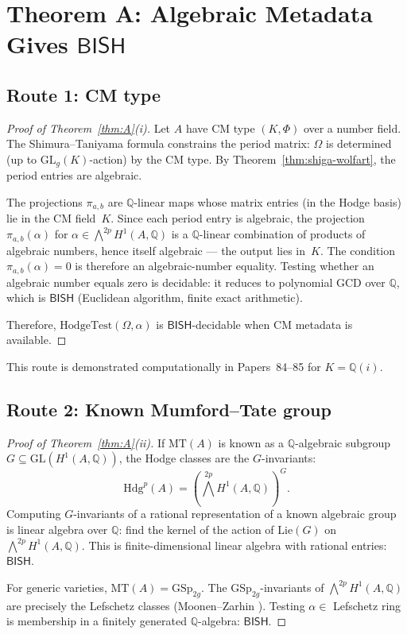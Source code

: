 \documentclass[11pt]{article}
\theoremstyle{plain}
\theoremstyle{definition}
\theoremstyle{remark}
\newcommand{\Q}{\mathbb{Q}}
\newcommand{\GL}{\mathrm{GL}}
\newcommand{\MT}{\mathrm{MT}}
\newcommand{\Hdg}{\mathrm{Hdg}}
\newcommand{\BISH}{\ensuremath{\mathsf{BISH}}}
\begin{document}
\section{Theorem A: Algebraic Metadata Gives $\BISH$}\label{sec:thmA}

\subsection{Route 1: CM type}

\begin{proof}[Proof of Theorem~\ref{thm:A}(i)]
Let $A$ have CM type $(K, \Phi)$ over a number field. The Shimura--Taniyama formula constrains the period matrix: $\Omega$ is determined (up to $\GL_g(K)$-action) by the CM type. By Theorem~\ref{thm:shiga-wolfart}, the period entries are algebraic.

The projections $\pi_{a,b}$ are $\Q$-linear maps whose matrix entries (in the Hodge basis) lie in the CM field~$K$. Since each period entry is algebraic, the projection $\pi_{a,b}(\alpha)$ for $\alpha \in \bigwedge^{2p} H^1(A, \Q)$ is a $\Q$-linear combination of products of algebraic numbers, hence itself algebraic --- the output lies in~$K$. The condition $\pi_{a,b}(\alpha) = 0$ is therefore an algebraic-number equality. Testing whether an algebraic number equals zero is decidable: it reduces to polynomial GCD over $\Q$, which is $\BISH$ (Euclidean algorithm, finite exact arithmetic).

Therefore, $\mathrm{HodgeTest}(\Omega, \alpha)$ is $\BISH$-decidable when CM metadata is available.
\end{proof}

This route is demonstrated computationally in Papers~84--85 for $K = \Q(i)$.

\subsection{Route 2: Known Mumford--Tate group}

\begin{proof}[Proof of Theorem~\ref{thm:A}(ii)]
If $\MT(A)$ is known as a $\Q$-algebraic subgroup $G \subseteq \GL(H^1(A, \Q))$, the Hodge classes are the $G$-invariants:
\[
\Hdg^p(A) = \left(\bigwedge^{2p} H^1(A, \Q)\right)^G.
\]
Computing $G$-invariants of a rational representation of a known algebraic group is linear algebra over $\Q$: find the kernel of the action of $\mathrm{Lie}(G)$ on $\bigwedge^{2p} H^1(A, \Q)$. This is finite-dimensional linear algebra with rational entries: $\BISH$.

For generic varieties, $\MT(A) = \mathrm{GSp}_{2g}$. The $\mathrm{GSp}_{2g}$-invariants of $\bigwedge^{2p} H^1(A, \Q)$ are precisely the Lefschetz classes (Moonen--Zarhin \cite{MoonenZarhin1999}). Testing $\alpha \in$ Lefschetz ring is membership in a finitely generated $\Q$-algebra: $\BISH$.
\end{proof}
\end{document}
